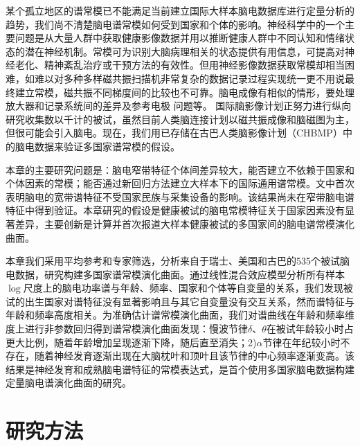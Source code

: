 某个孤立地区的谱常模已不能满足当前建立国际大样本脑电数据库进行定量分析的趋势，我们尚不清楚脑电谱常模如何受到国家和个体的影响。神经科学中的一个主要问题是从大量人群中获取健康影像数据并用以推断健康人群中不同认知和情绪状态的潜在神经机制。常模可为识别大脑病理相关的状态提供有用信息，可提高对神经老化、精神紊乱治疗或干预方法的有效性。但用神经影像数据获取常模却相当困难，如难以对多种多样磁共振扫描机非常复杂的数据记录过程实现统一更不用说最终建立常模，磁共振不同梯度间的比较也不可靠。脑电成像有相似的情形，要处理放大器和记录系统间的差异及参考电极
问题等。 国际脑影像计划正努力进行纵向研究收集数以千计的被试，虽然目前人类脑连接计划以磁共振成像和脑磁图为主，但很可能会引入脑电。现在，我们用已存储在古巴人类脑影像计划（CHBMP）中的脑电数据来验证多国家谱常模的假设。

本章的主要研究问题是：脑电窄带特征个体间差异较大，能否建立不依赖于国家和个体因素的常模；能否通过新回归方法建立大样本下的国际通用谱常模。\cite{john1977neurometrics}文中首次表明脑电的宽带谱特征不受国家民族与采集设备的影响。该结果尚未在窄带脑电谱特征中得到验证。本章研究的假设是健康被试的脑电常模特征关于国家因素没有显著差异，主要创新是计算并首次报道大样本健康被试的多国家间的脑电谱常模演化曲面。

本章我们采用平均参考和专家筛选，分析来自于瑞士、美国和古巴的535个被试脑电数据，研究构建多国家谱常模演化曲面。通过线性混合效应模型分析所有样本$\log$尺度上的脑电功率谱与年龄、频率、国家和个体等自变量的关系，我们发现被试的出生国家对谱特征没有显著影响且与其它自变量没有交互关系，然而谱特征与年龄和频率高度相关。为准确估计谱常模演化曲面，我们对谱曲线在年龄和频率维度上进行非参数回归得到谱常模演化曲面发现：慢波节律$\delta$、$\theta$在被试年龄较小时占更大比例，随着年龄增加呈现逐渐下降，随后直至消失；2)$\alpha$节律在年纪较小时不存在，随着神经发育逐渐出现在大脑枕叶和顶叶且该节律的中心频率逐渐变高。该结果是神经发育和成熟脑电谱特征的常模表达式，是首个使用多国家脑电数据构建定量脑电谱演化曲面的研究。
\section{研究方法}
